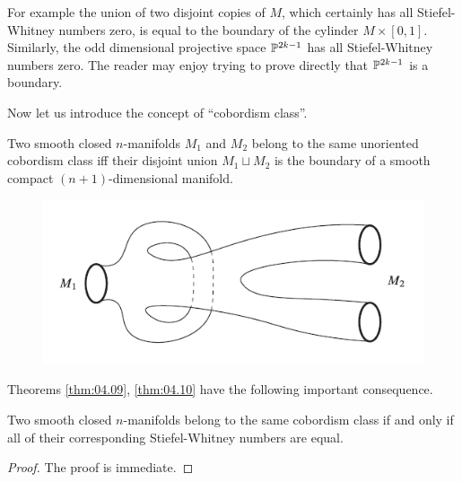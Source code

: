 \documentclass[../main]{subfiles}
\begin{document}
For example the union of two disjoint copies of $M$, which certainly
has all Stiefel-Whitney numbers zero, is equal to the boundary of the
cylinder $M\times [0, 1]$. Similarly, the odd dimensional projective space
$\mathbb{P}^{2k-1}$ has all Stiefel-Whitney numbers zero. The reader may enjoy trying
to prove directly that $\mathbb{P}^{2k-1}$ is a boundary.

Now let us introduce the concept of ``cobordism class''.

\begin{definition}\label{def:04.03}
Two smooth closed $n$-manifolds $M_1$ and $M_2$ belong
to the same unoriented cobordism class iff their disjoint union $M_1 \sqcup M_2$
is the boundary of a smooth compact $(n+1)$-dimensional manifold.	
\end{definition}

\begin{figure}[ht]
    \centering
    \includegraphics[scale=0.6]{"../tex from old group/fig6.png"}
    \caption{}
    \label{fig:figure6}
\end{figure}


Theorems \ref{thm:04.09}, \ref{thm:04.10} have the following important consequence.
\begin{corollary}\label{cor:04.11}
Two smooth closed $n$-manifolds belong to
the same cobordism class if and only if all of their corresponding Stiefel-Whitney numbers are equal.	
\end{corollary}
\begin{proof}
The proof is immediate.
\end{proof}
\end{document}
